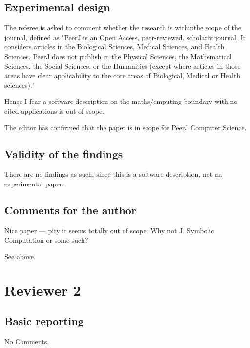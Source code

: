 \documentclass[answers,12pt]{exam}
\begin{document}
\subsection{Experimental design}
\begin{questions}
\question The referee is asked to comment whether the research is withinthe scope of the
journal, defined as "PeerJ is an Open Access, peer-reviewed, scholarly
journal. It considers articles in the Biological Sciences, Medical Sciences,
and Health Sciences. PeerJ does not publish in the Physical Sciences, the
Mathematical Sciences, the Social Sciences, or the Humanities (except where
articles in those areas have clear applicability to the core areas of
Biological, Medical or Health sciences)."

Hence I fear a software description on the maths/cmputing boundary with no
cited applications is out of scope.

\begin{solution}
  The editor has confirmed that the paper is in scope for PeerJ Computer Science.
\end{solution}
\end{questions}

\subsection{Validity of the findings}
\begin{questions}
\question There are no findings as such, since this is a software description, not an
experimental paper.
\end{questions}

\subsection{Comments for the author}
\begin{questions}
\question Nice paper --- pity it seems totally out of scope. Why not J. Symbolic
Computation or some such?
\begin{solution}
  See above.
\end{solution}
\end{questions}

\section{Reviewer 2}

\subsection{Basic reporting}
No Comments.
\end{document}
